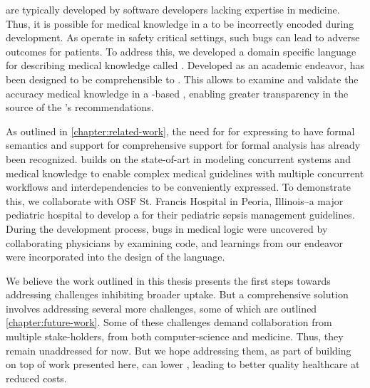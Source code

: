 \CDSSs{} are typically developed by software developers lacking expertise in
medicine. Thus, it is possible for medical knowledge in a \CDSS{} to be incorrectly
encoded during development. As \CDSSs{} operate in safety critical settings, such
bugs can lead to adverse outcomes for patients. To address this,
we developed a domain specific language for describing medical knowledge
called \MediK{}. Developed as an academic endeavor, \MediK{} has been designed to be
comprehensible to \HCPs{}. This allows \HCPs{} to examine and validate the accuracy
medical knowledge in a \MediK-based \CDSS{}, enabling greater transparency in
the source of the \CDSS{}'s recommendations.

As outlined in \autoref{chapter:related-work}, the need for \DSLs{} for
expressing \BPGs{} to have formal semantics and support for comprehensive
support for formal analysis has already been recognized. \MediK{} builds
on the state-of-art in modeling concurrent systems and medical knowledge
to enable complex medical guidelines with multiple concurrent workflows
and interdependencies to be conveniently expressed. To demonstrate this,
we collaborate with OSF St. Francis Hospital in Peoria, Illinois--a
major pediatric hospital to develop a \CDSS{} for their pediatric
sepsis management guidelines. During the development process, bugs in
medical logic were uncovered by collaborating physicians by examining
\MediK{} code, and learnings from our endeavor were incorporated into the
design of the language.

We believe the work outlined in this thesis presents the first steps towards
addressing challenges inhibiting broader \CDSS{} uptake. But a comprehensive
solution involves addressing several more challenges, some of which are
outlined \autoref{chapter:future-work}. Some of these challenges demand
collaboration from multiple stake-holders, from both computer-science and
medicine. Thus, they remain unaddressed for now. But we hope addressing
them, as part of building on top of work presented here, can lower \PMEs{},
leading to better quality healthcare at reduced costs.
